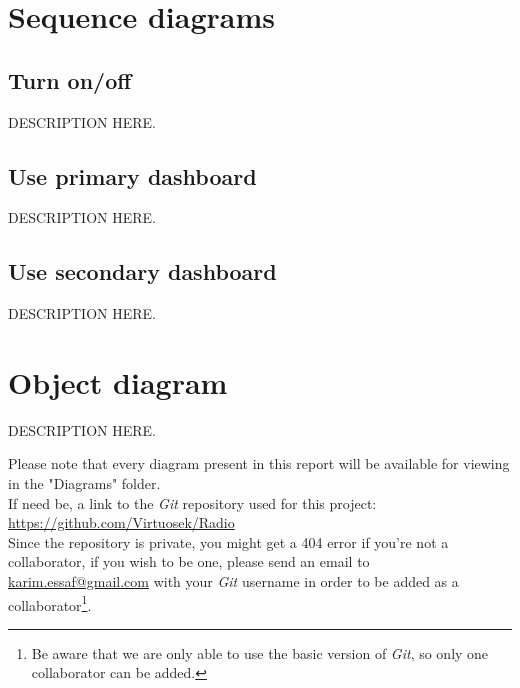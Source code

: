 \documentclass[11pt]{article}
\begin{document}
\pagebreak
\section{Sequence diagrams}
\subsection{Turn on/off}
\vspace{10px}
\begin{center}
\end{center}
DESCRIPTION HERE.

\subsection{Use primary dashboard}
\vspace{10px}
\begin{center}
\end{center}
DESCRIPTION HERE.
\subsection{Use secondary dashboard}
\vspace{10px}
\begin{center}
\end{center}
DESCRIPTION HERE.


\pagebreak
\section{Object diagram}
\vspace{10px}
\begin{center}
\end{center}
DESCRIPTION HERE.

\pagebreak
{}
\vspace*{\fill}
\begin{center}
Please note that every diagram present in this report will be available for viewing in the "Diagrams" folder.\\\vspace{30px}
If need be, a link to the \textit{Git} repository used for this project:\\
\url{https://github.com/Virtuosek/Radio}\\
Since the repository is private, you might get a 404 error if you're not a collaborator, if you wish to be one, please send an email to \href{mailto:karim.essaf@gmail.com}{karim.essaf@gmail.com} with your \textit{Git} username in order to be added as a collaborator\footnote{Be aware that we are only able to use the basic version of \textit{Git}, so only one collaborator can be added.}.
\end{center}
\vspace*{\fill}
\end{document}
